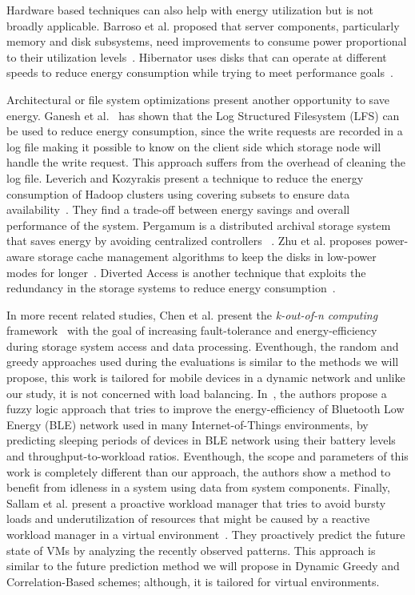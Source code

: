 \documentclass[preprint,12pt]{elsarticle}
\begin{document}
Hardware based techniques can also help with energy utilization but is
not broadly applicable.
Barroso et al. proposed that server components, particularly memory and disk
subsystems, need improvements to consume power proportional to their utilization levels~\cite{33387}.
Hibernator uses disks that can operate at different speeds to reduce energy consumption while trying to
meet performance goals~\cite{Zhu:2005:HHD:1095810.1095828}.

Architectural or file system optimizations present another opportunity
to save energy.
Ganesh et al.~\cite{GaneshWeatherspoonBalakrishnanBirman07_OptimizingPowerConsumptionInLargeScaleStorageSystems}
has shown that the Log Structured Filesystem (LFS) can be used to reduce energy consumption, since
the write requests are recorded in a log file making it possible to know on the client side which
storage node will handle the write request. This approach suffers from the overhead of cleaning
the log file.
Leverich and Kozyrakis present a technique to reduce the energy consumption of Hadoop clusters using
covering subsets to ensure data availability~\cite{Leverich:2010:EEH:1740390.1740405}. They find a trade-off
between energy savings and overall performance of the system.
Pergamum is a distributed archival storage system that saves energy by avoiding centralized controllers
~\cite{Storer:2008:PRT:1364813.1364814}.
Zhu et al. proposes power-aware storage cache management algorithms to keep the disks in low-power modes
for longer~\cite{Zhu:2004:REC:1072448.1072462}.
Diverted Access is another technique that exploits the redundancy in the storage systems to reduce
energy consumption~\cite{Pinheiro:2006:ERC:1140277.1140281}.

In more recent related studies, Chen et al. present the \textit{k-out-of-n computing} framework~\cite{6847230}
with the goal of increasing fault-tolerance and energy-efficiency during storage system access and data
processing. Eventhough, the random and greedy approaches used during the evaluations is similar
to the methods we will propose, this work is tailored for mobile devices in a dynamic network and unlike our
study, it is not concerned with load balancing. In~\cite{Collotta2015137}, the authors propose a fuzzy logic
approach that tries to improve the energy-efficiency of Bluetooth Low Energy (BLE) network used in many
Internet-of-Things environments, by predicting sleeping periods of devices in BLE network using their battery
levels and throughput-to-workload ratios. Eventhough, the scope and parameters of this work is completely
different than our approach, the authors show a method to benefit from idleness in a system using data from
system components. Finally, Sallam et al. present a proactive workload manager that tries to avoid bursty loads and
underutilization of resources that might be caused by a reactive workload manager in a virtual environment~\cite{Sallam:2014:PWM:2658292.2658555}.
They proactively predict the future state of VMs by analyzing the recently observed patterns. This approach
is similar to the future prediction method we will propose in Dynamic Greedy and Correlation-Based schemes; although,
it is tailored for virtual environments.
\end{document}

